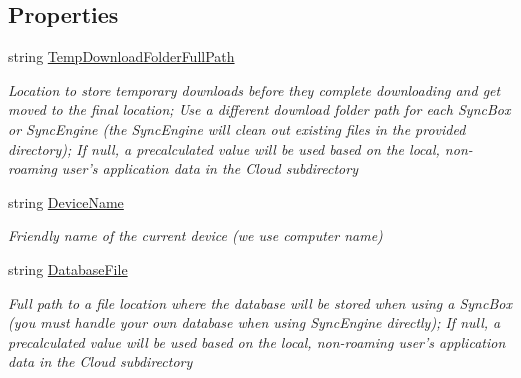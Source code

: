 \subsection*{Properties}
\begin{DoxyCompactItemize}
\item 
string \hyperlink{interface_cloud_api_public_1_1_interfaces_1_1_i_sync_settings_advanced_ad7bd9a4765d6090a05a97222c8cfd222}{Temp\-Download\-Folder\-Full\-Path}
\begin{DoxyCompactList}\small\item\em Location to store temporary downloads before they complete downloading and get moved to the final location; Use a different download folder path for each Sync\-Box or Sync\-Engine (the Sync\-Engine will clean out existing files in the provided directory); If null, a precalculated value will be used based on the local, non-\/roaming user's application data in the Cloud subdirectory \end{DoxyCompactList}\item 
string \hyperlink{interface_cloud_api_public_1_1_interfaces_1_1_i_sync_settings_advanced_a6c77d27d7e668673e0739f84d500e5f4}{Device\-Name}
\begin{DoxyCompactList}\small\item\em Friendly name of the current device (we use computer name) \end{DoxyCompactList}\item 
string \hyperlink{interface_cloud_api_public_1_1_interfaces_1_1_i_sync_settings_advanced_a16054154b37da7455f410a3b8f074a27}{Database\-File}
\begin{DoxyCompactList}\small\item\em Full path to a file location where the database will be stored when using a Sync\-Box (you must handle your own database when using Sync\-Engine directly); If null, a precalculated value will be used based on the local, non-\/roaming user's application data in the Cloud subdirectory \end{DoxyCompactList}\end{DoxyCompactItemize}


